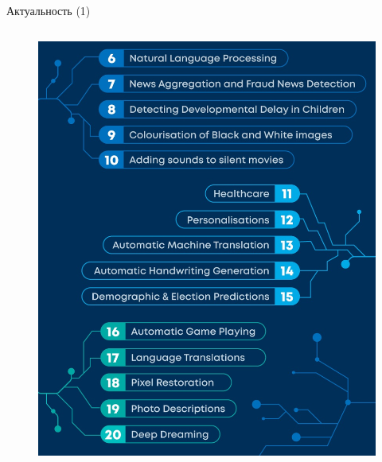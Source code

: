 \documentclass[10pt]{beamer}
\begin{document}
\begin{frame}{Актуальность (1)}
\begin{columns}
\begin{column}{0.5\textwidth}
\begin{figure}[H]
                          \includegraphics[width=\textwidth]{application_2.jpg}
                          \label{fig:pic1_1}
                    \end{figure}
                \end{column}
            \end{columns}
        \end{frame}
\end{document}
